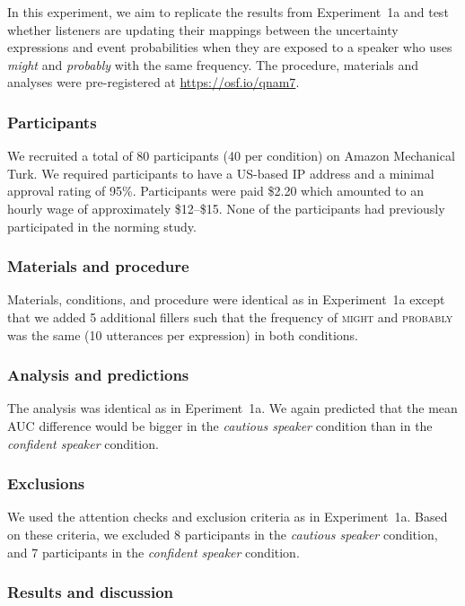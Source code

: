 \documentclass[lucida,biblatex]{sp} %
\begin{document}
In this experiment, we aim to replicate the results from Experiment~1a and test whether listeners are updating their 
mappings between the uncertainty expressions and event probabilities when they are exposed to a speaker who
uses \textit{might} and \textit{probably} with the same frequency.  The procedure, materials and analyses were pre-registered at \url{https://osf.io/qnam7}.
\subsubsection{Participants}
We recruited a total of 80 participants (40 per condition) on Amazon Mechanical Turk. 
We required participants to have a US-based IP address and a minimal approval rating 
of 95\%. Participants were paid \$2.20 which amounted to an hourly wage of approximately 
\$12--\$15. None of the participants had previously participated in the norming study.

\subsubsection{Materials and procedure}

Materials, conditions, and procedure were identical as in Experiment~1a except that we added 5 additional fillers such
that the frequency of \textsc{might} and \textsc{probably} was the same (10 utterances per expression) in both conditions.

\subsubsection{Analysis and predictions}  

The analysis was identical as in Eperiment~1a. We again predicted that the mean AUC difference would be bigger in the 
\emph{cautious speaker} condition than in the \emph{confident speaker} condition.

\subsubsection{Exclusions} We used the attention checks and exclusion criteria as in Experiment~1a.  Based on these criteria, we excluded 8 participants in the \textit{cautious speaker} condition, and 7 participants in the \textit{confident speaker} condition.

\subsubsection{Results and discussion}
\end{document}
